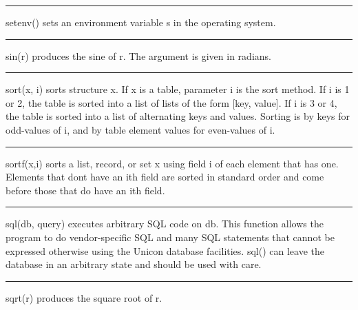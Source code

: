 \bigskip\hrule\vspace{0.1cm}

\noindent
{}\textsf{setenv()} sets an environment variable
\textsf{s} in the operating system.

\bigskip\hrule\vspace{0.1cm}

\noindent
{}sin(r) produces the sine of r. The argument is given in
radians.

\bigskip\hrule\vspace{0.1cm}

\noindent
{}\textsf{sort(x, i)} sorts structure \textsf{x}. If
\textsf{x} is a table, parameter \textsf{i} is the sort method. If
\textsf{i} is 1 or 2, the table is sorted into a list of lists of the
form [key, value]. If \textsf{i} is 3 or 4, the table is sorted into a
list of alternating keys and values. Sorting is by keys for odd-values
of \textsf{i}, and by table element values for even-values of
\textsf{i}.

\bigskip\hrule\vspace{0.1cm}

\noindent
{}\textsf{sortf(x,i)} sorts a list, record, or set
\textsf{x} using field \textsf{i} of each element that has one.
Elements that don{\textquotesingle}t have an
\textsf{i}{\textquotesingle}th field are sorted in standard order and
come before those that do have an \textsf{i}{\textquotesingle}th field.

\bigskip\hrule\vspace{0.1cm}

\noindent
{}\textsf{sql(db, query)} executes arbitrary SQL code on
\textsf{db}. This function allows the program to do vendor-specific SQL
and many SQL statements that cannot be expressed otherwise using the
Unicon database facilities. \textsf{sql()} can leave the database in an
arbitrary state and should be used with care.

\bigskip\hrule\vspace{0.1cm}

\noindent
{}\textsf{sqrt(r)} produces the square root of
\textsf{r}.


